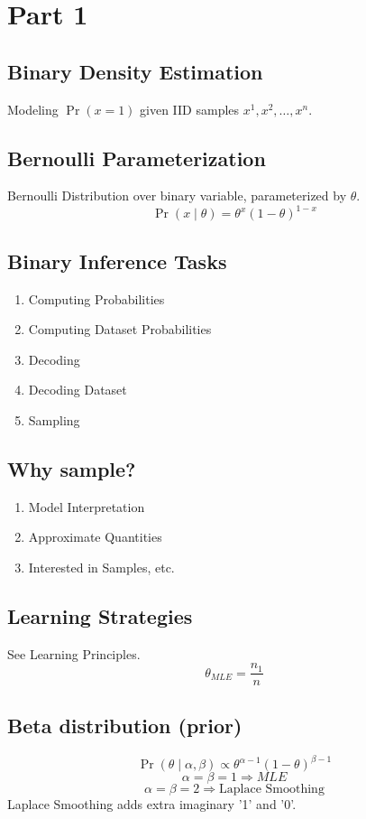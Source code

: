 \section{Part 1}
\subsection*{Binary Density Estimation}
Modeling $\Pr(x=1)$ given IID samples $x^1,x^2,\dots,x^n$.
\subsection*{Bernoulli Parameterization}
Bernoulli Distribution over binary variable, parameterized by $\theta$.
\[\Pr(x\mid\theta)=\theta^x (1-\theta)^{1-x}\]
\subsection*{Binary Inference Tasks}
\begin{enumerate}
    \item Computing Probabilities
    \item Computing Dataset Probabilities
    \item Decoding
    \item Decoding Dataset
    \item Sampling
\end{enumerate}
\subsection*{Why sample?}
\begin{enumerate}
    \item Model Interpretation
    \item Approximate Quantities
    \item Interested in Samples, etc.
\end{enumerate}
\subsection*{Learning Strategies}
See Learning Principles.
\[\theta_{MLE} = \frac{n_1}{n}\]
\subsection*{Beta distribution (prior)}
\[\Pr(\theta\mid\alpha,\beta)\propto \theta^{\alpha-1}(1-\theta)^{\beta-1}\]
\[\alpha=\beta=1\Rightarrow MLE\]
\[\alpha=\beta=2\Rightarrow \text{Laplace Smoothing}\]
Laplace Smoothing adds extra imaginary '1' and '0'.
